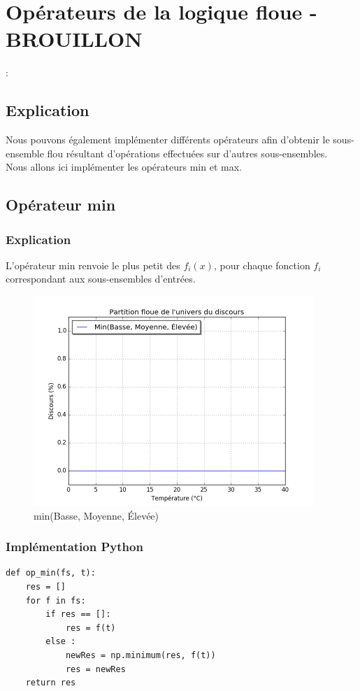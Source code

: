 \documentclass[a4paper]{article}
\begin{document}
\section{Opérateurs de la logique floue -BROUILLON}:

\subsection{Explication}
Nous pouvons également implémenter différents opérateurs afin d'obtenir le sous-ensemble flou résultant d'opérations effectuées sur d'autres sous-ensembles.\\
Nous allons ici implémenter les opérateurs min et max.

\subsection{Opérateur min}

\subsubsection{Explication}
L'opérateur min renvoie le plus petit des $f_i(x)$, pour chaque fonction $f_i$ correspondant aux sous-ensembles d'entrées.

\begin{figure}[h]
\begin{center}
	\includegraphics[width=400px]{plot_test_min.png}
\end{center}
\caption{min(Basse, Moyenne, Élevée)}
\end{figure}

\subsubsection{Implémentation Python}
\begin{lstlisting}
def op_min(fs, t):
    res = []
    for f in fs:
        if res == []:
            res = f(t)
        else :
            newRes = np.minimum(res, f(t))
            res = newRes
    return res
\end{lstlisting}
\end{document}
